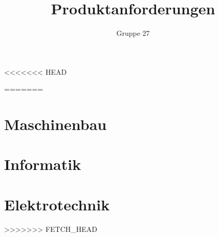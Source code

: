 \documentclass[a4paper,10pt,fleqn]{article}
\title{Produktanforderungen}
\author{Gruppe 27}
\begin{document}
\maketitle
\clearpage
\tableofcontents
\clearpage
<<<<<<< HEAD

=======

\section{Maschinenbau}

\section{Informatik}

\section{Elektrotechnik}

>>>>>>> FETCH_HEAD
\end{document}
